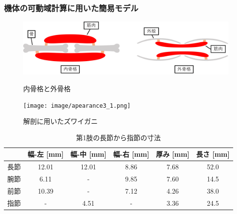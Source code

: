 \subsubsection{機体の可動域計算に用いた簡易モデル}
\begin{figure}[b]
    \begin{minipage}{0.49\hsize}
      \vspace{15mm}
      \centering
      \includegraphics[scale=0.058]{image/kokkaku.png}
      \caption{内骨格と外骨格}
      \label{fig:naigai}
    \end{minipage}
    \begin{minipage}{0.49\hsize}
      \centering
      \texttt{[image: image/apearance3\_1.png]}
      \caption{解剖に用いたズワイガニ}
      \label{fig:zuwai}
    \end{minipage}
\end{figure}
\begin{table}[htbp]
  \centering
  \caption{第1肢の長節から指節の寸法}
  \label{tab:1setu}
  \vspace{-3mm}
  \begin{tabular}{|l|c|c|c|c|c|}
  \hline
     & \multicolumn{1}{l|}{幅-左 [mm]} & \multicolumn{1}{l|}{幅-中 [mm]} & \multicolumn{1}{l|}{幅-右 [mm]} & \multicolumn{1}{l|}{厚み [mm]} & \multicolumn{1}{l|}{長さ [mm]} \\ \hline
  長節 & 12.01                       & 12.01                       & 8.86                        & 7.68                        & 52.0                        \\ \hline
  腕節 & 6.11                        & -                           & 9.85                        & 7.60                        & 14.5                        \\ \hline
  前節 & 10.39                       & -                           & 7.12                        & 4.26                        & 38.0                        \\ \hline
  指節 & -                           & 4.51                        & -                           & 3.36                        & 24.5                        \\ \hline
  \end{tabular}
\end{table}
